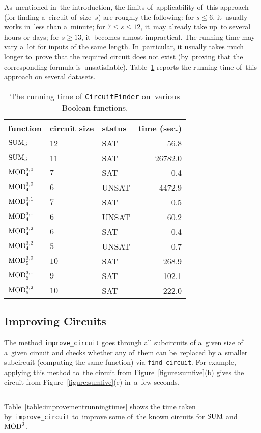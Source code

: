 As~mentioned in~the introduction, the limits
of~applicability of~this approach (for finding a~circuit
of~size~$s$) are roughly the following:
for $s \le 6$, it~usually works in~less than a~minute;
for $7 \le s \le 12$, it~may already take up~to
several hours or days; for $s \ge 13$, it~becomes almost impractical. The running time may vary a~lot
for inputs of the same length. In~particular,
it usually takes much longer to~prove that
the required circuit does not exist (by~proving that the corresponding formula is~unsatisfiable). Table~\ref{table:runningtimes} reports the running time
of~this approach on several datasets.

\begin{table}[ht]
\begin{center}
\begin{tabular}{lllr}
\toprule
function & circuit size & status & time (sec.)\\
\midrule
$\operatorname{SUM}_5$ & 12 & SAT & 56.8\\
$\operatorname{SUM}_5$ & 11 & SAT & 26782.0\\
$\operatorname{MOD}_4^{3,0}$ & $7$ & SAT & 0.4\\
$\operatorname{MOD}_4^{3,0}$ & $6$ & UNSAT & 4472.9\\
$\operatorname{MOD}_4^{3,1}$ & $7$ & SAT & 0.5\\
$\operatorname{MOD}_4^{3,1}$ & $6$ & UNSAT & 60.2\\
$\operatorname{MOD}_4^{3,2}$ & $6$ & SAT & 0.4\\
$\operatorname{MOD}_4^{3,2}$ & $5$ & UNSAT & 0.7\\

$\operatorname{MOD}_5^{3,0}$ & $10$ & SAT & 268.9\\
$\operatorname{MOD}_5^{3,1}$ & $9$ & SAT & 102.1\\
$\operatorname{MOD}_5^{3,2}$ & $10$ & SAT & 222.0\\
\bottomrule
\end{tabular}
\end{center}
\caption{The running time of \texttt{CircuitFinder} on~various Boolean functions.} \label{table:runningtimes}
\end{table}



\subsection{Improving Circuits}
The method \texttt{improve_circuit}
goes through all subcircuits of a~given size
of a~given circuit and checks whether any
of~them can be~replaced by a~smaller subcircuit
(computing the same function) via \texttt{find_circuit}. For example, applying this method
to~the circuit from Figure~\ref{figure:sumfive}(b)
gives the circuit from Figure~\ref{figure:sumfive}(c)
in~a~few seconds.
%
\inputminted[firstline=62,lastline=67]{python}{../tutorial.py}
Table~\ref{table:improvementrunningtimes} shows the time
taken by~\texttt{improve\_circuit} to~improve some
of~the known circuits for $\operatorname{SUM}$ and $\operatorname{MOD}^3$.

